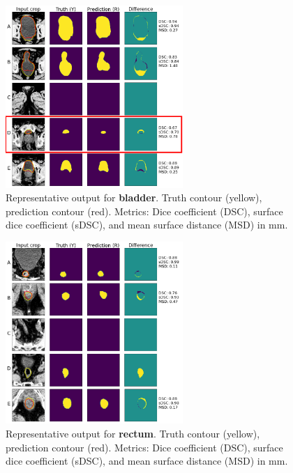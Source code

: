 \documentclass[9pt]{beamer}
\begin{document}
\begin{frame}{}
  \begin{figure}
    \includegraphics[width=0.60\textwidth]{images/prostate_bladder_worst}
    \caption{Representative output for \textbf{bladder}. Truth contour (yellow),
      prediction contour (red).
      Metrics: Dice coefficient (DSC), surface dice coefficient (sDSC), and mean
      surface distance (MSD) in mm.}
  \end{figure}
\end{frame}
%
\begin{frame}{}
  \begin{figure}
    \includegraphics[width=0.60\textwidth]{images/prostate_rectum}
    \caption{Representative output for \textbf{rectum}. Truth contour (yellow),
      prediction contour (red).
      Metrics: Dice coefficient (DSC), surface dice coefficient (sDSC), and mean
      surface distance (MSD) in mm.}
  \end{figure}
\end{frame}
\end{document}
